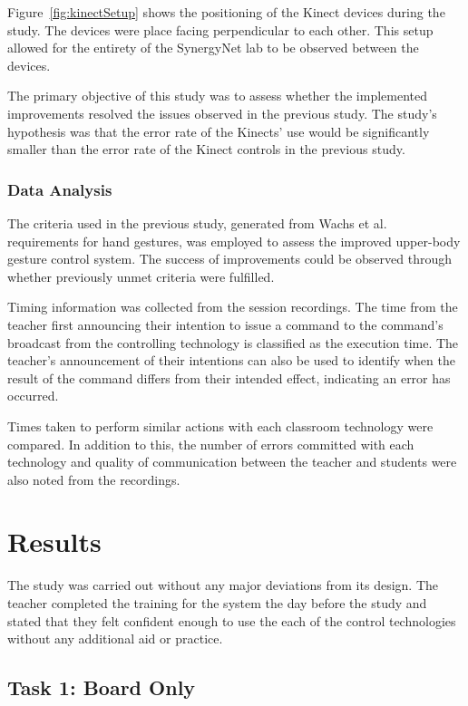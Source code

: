 \documentclass[link]{IWCOMP}
\begin{document}
Figure~\ref{fig:kinectSetup} shows the positioning of the Kinect devices during the study.
The devices were place facing perpendicular to each other.
This setup allowed for the entirety of the SynergyNet lab to be observed between the devices.

The primary objective of this study was to assess whether the implemented improvements resolved the issues observed in the previous study.
The study's hypothesis was that the error rate of the Kinects' use would be significantly smaller than the error rate of the Kinect controls in the previous study.

\subsubsection{Data Analysis}
\label{subsec:studyAnalysis}

The criteria used in the previous study, generated from Wachs et al.~\cite{Wachs2011} requirements for hand gestures, was employed to assess the improved upper-body gesture control system.
The success of improvements could be observed through whether previously unmet criteria were fulfilled.

Timing information was collected from the session recordings.
The time from the teacher first announcing their intention to issue a command to the command's broadcast from the controlling technology is classified as the execution time.
The teacher's announcement of their intentions can also be used to identify when the result of the command differs from their intended effect, indicating an error has occurred.

Times taken to perform similar actions with each classroom technology were compared.
In addition to this, the number of errors committed with each technology and quality of communication between the teacher and students were also noted from the recordings.

\section{Results}
\label{sec:results}


The study was carried out without any major deviations from its design.
The teacher completed the training for the system the day before the study and stated that they felt confident enough to use the each of the control technologies without any additional aid or practice.

\subsection{Task 1: Board Only}
\label{subsec:resultsTask1}
\end{document}

